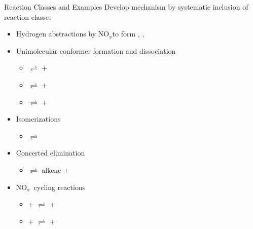 \documentclass[10pt,presentation]{beamer}
\newcommand{\nox}{NO$_x$} %
\begin{document}
\begin{frame}{Reaction Classes and Examples}
    Develop mechanism by systematic inclusion of reaction classes
    \begin{itemize}
        \item Hydrogen abstractions by \nox to form , , 
        \item Unimolecular conformer formation and dissociation
        \begin{itemize}
            \item {}$\rightleftharpoons$  + 
            \item {}$\rightleftharpoons$  + 
            \item {}$\rightleftharpoons$  + 
        \end{itemize}
        \item Isomerizations  
        \begin{itemize}
            \item {}$\rightleftharpoons$ 
        \end{itemize}
        \item Concerted  elimination
        \begin{itemize}
            \item {}$\rightleftharpoons$ alkene + 
        \end{itemize}
        \item \nox\ cycling reactions
        \begin{itemize}
            \item {} +  $\rightleftharpoons$  + 
            \item {} +  $\rightleftharpoons$  + 
        \end{itemize}
    \end{itemize}
\end{frame}
\end{document}

